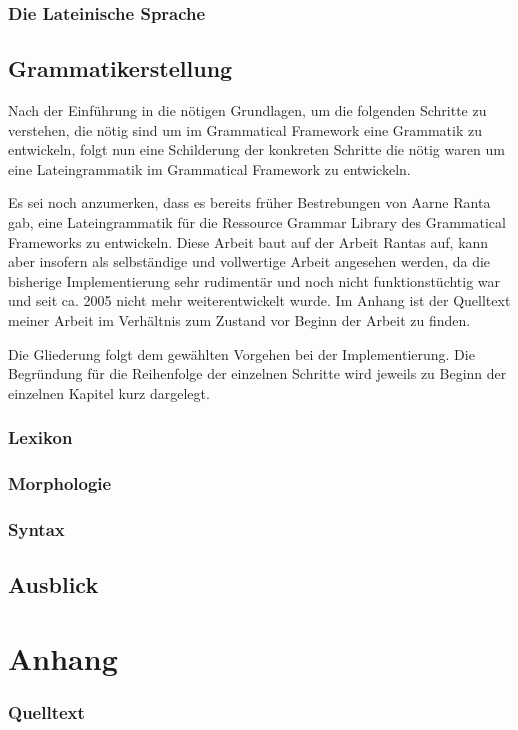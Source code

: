 \documentclass[fontsize=12pt,abstract=on,titlepage,bibliography=totoc,ngerman,listof=totoc]{scrreprt}
\begin{document}
\section{Die Lateinische Sprache}
\label{sec:latein}

\pagebreak
\chapter{Grammatikerstellung}
\label{chap:grammatik}
Nach der Einführung in die nötigen Grundlagen, um die folgenden Schritte zu verstehen, die nötig sind um im Grammatical Framework eine Grammatik zu entwickeln, folgt nun eine Schilderung der konkreten Schritte die nötig waren um eine Lateingrammatik im Grammatical Framework zu entwickeln. \par
Es sei noch anzumerken, dass es bereits früher Bestrebungen von Aarne Ranta gab, eine Lateingrammatik für die Ressource Grammar Library des Grammatical Frameworks zu entwickeln. Diese Arbeit baut auf der Arbeit Rantas auf, kann aber insofern als selbständige und vollwertige Arbeit angesehen werden, da die bisherige Implementierung sehr rudimentär und noch nicht funktionstüchtig war und seit ca. 2005 nicht mehr weiterentwickelt wurde. Im Anhang ist der Quelltext meiner Arbeit im Verhältnis zum Zustand vor Beginn der Arbeit zu finden. \par
Die Gliederung folgt dem gewählten Vorgehen bei der Implementierung. Die Begründung für die Reihenfolge der einzelnen Schritte wird jeweils zu Beginn der einzelnen Kapitel kurz dargelegt.
\pagebreak
\section{Lexikon}
\label{sec:lexikon}

\FloatBarrier
\pagebreak
\section{Morphologie}
\label{sec:morpho}

\FloatBarrier
\pagebreak
\section{Syntax}
\label{sec:syntax}

\FloatBarrier
\pagebreak
\chapter{Ausblick}
\label{chap:ausblick}

\FloatBarrier
\pagebreak
\clearpage
{}
\setcounter{page}{1}
%
\printbibliography
\pagebreak

\part{Anhang}
\label{part:anhang}
\section{Quelltext}
\label{sec:quelltext}
%
\end{document}
